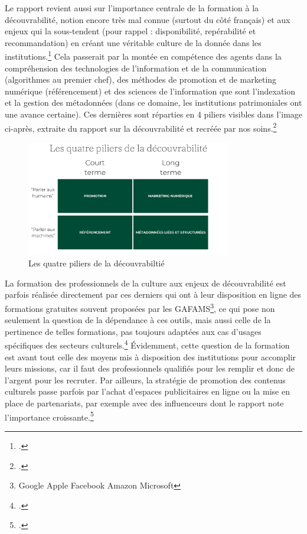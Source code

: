 Le rapport revient aussi sur l’importance centrale de la formation à la découvrabilité, notion encore très mal connue (surtout du côté français) et aux enjeux qui la sous-tendent (pour rappel : disponibilité, repérabilité et recommandation) en créant une véritable culture de la donnée dans les institutions.\footcite[p. 23]{ministeresdelaculturefranceetquebec2020} Cela passerait par la montée en compétence des agents dans la compréhension des technologies de l’information et de la communication (algorithmes au premier chef), des méthodes de promotion et de marketing numérique (référencement) et des sciences de l’information que sont l’indexation et la gestion des métadonnées (dans ce domaine, les institutions patrimoniales ont une avance certaine). Ces dernières sont réparties en 4 piliers visibles dans l’image ci-après, extraite du rapport sur la découvrabilité et recréée par nos soins.\footcite[p. 21]{ministeresdelaculturefranceetquebec2020}



\begin{figure}[h!]
	\centering
	\includegraphics[width=0.8\textwidth]{images/image26.png}
	\caption{Les quatre piliers de la découvrabiltié}
	\label{fig:image26}
\end{figure}



La formation des professionnels de la culture aux enjeux de découvrabilité est parfois réalisée directement par ces derniers qui ont à leur disposition en ligne des formations gratuites souvent proposées par les GAFAMS\footnote{Google Apple Facebook Amazon Microsoft }, ce qui pose non seulement la question de la dépendance à ces outils, mais aussi celle de la pertinence de telles formations, pas toujours adaptées aux cas d’usages spécifiques des secteurs culturels.\footcite[p. 22]{ministeresdelaculturefranceetquebec2020} Évidemment, cette question de la formation est avant tout celle des moyens mis à disposition des institutions pour accomplir leurs missions, car il faut des professionnels qualifiés pour les remplir et donc de l’argent pour les recruter. Par ailleurs, la stratégie de promotion des contenus culturels passe parfois par l’achat d’espaces publicitaires en ligne ou la mise en place de partenariats, par exemple avec des influenceurs dont le rapport note l’importance croissante.\footcite[p. 22]{ministeresdelaculturefranceetquebec2020} 

